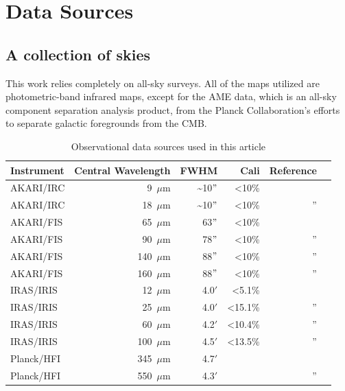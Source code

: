\chapter{Data Sources}
  \label{ch:datasources}

  \section{A collection of skies}
    This work relies completely on all-sky surveys. All of the maps utilized are photometric-band infrared maps, except for the AME data, which is an all-sky component separation analysis product, from the Planck Collaboration's efforts to separate galactic foregrounds from the CMB.


    \begin{table}[h]
      \label{tab:data}
      \caption{Observational data sources used in this article}
      \centering
        \begin{tabular}{lrrrrr}
        \hline\hline
        Instrument & Central Wavelength & FWHM & Cali & Reference \\
        \hline
        AKARI/IRC & 9~$\mu$m  &  \~{}10$"$ & \textless 10\%   & \tablefootnote{\citep{ishihara10}} \\
        AKARI/IRC & 18~$\mu$m & \~{}10$"$  & \textless 10\%     & '' \\
        AKARI/FIS & 65~$\mu$m  & 63$"$ & \textless 10\% & \tablefootnote{\cite{doi15,takita16}} \\
        AKARI/FIS & 90~$\mu$m  & 78$"$ & \textless 10\%   & '' \\
        AKARI/FIS & 140~$\mu$m & 88$"$ & \textless 10\%   & '' \\
        AKARI/FIS & 160~$\mu$m & 88$"$ & \textless 10\%   & '' \\
        IRAS/IRIS & 12~$\mu$m   & 4.0$'$ &   \textless 5.1\%       & \tablefootnote{\cite{iris05}} \\
        IRAS/IRIS & 25~$\mu$m   & 4.0$'$ &    \textless 15.1\%      & ''\\
        IRAS/IRIS & 60~$\mu$m   & 4.2$'$ &    \textless 10.4\%      & '' \\
        IRAS/IRIS & 100~$\mu$m  & 4.5$'$ &   \textless 13.5\%       & '' \\
        Planck/HFI & 345~$\mu$m & 4.7$'$ & & \tablefootnote{\cite{hfi14viii}} \\
        Planck/HFI & 550~$\mu$m & 4.3$'$& & '' \\
        \hline
      \end{tabular}
    \end{table}

